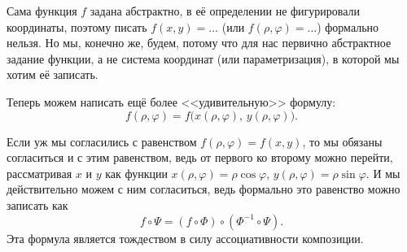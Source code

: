 Сама функция $f$ задана абстрактно, в её определении не фигурировали координаты, поэтому писать $f(x, y) = \ldots$ (или $f(\rho, \varphi) = \ldots$) формально нельзя. Но мы, конечно же, будем, потому что для нас первично абстрактное задание функции, а не система координат (или параметризация), в которой мы хотим её записать.

Теперь можем написать ещё более <<удивительную>> формулу:
\[
	f(\rho, \varphi) = f\big(x(\rho, \varphi),\,y(\rho, \varphi)\big).
\]

Если уж мы согласились с равенством $f(\rho, \varphi) = f(x, y)$, то мы обязаны согласиться и с этим равенством, ведь от первого ко второму можно перейти, рассматривая $x$ и $y$ как функции $x(\rho, \varphi) = \rho\cos\varphi$, $y(\rho, \varphi) = \rho\sin\varphi$. И мы действительно можем с ним согласиться, ведь формально это равенство можно записать как
\[
	f \circ \Psi = (f \circ \Phi) \circ (\Phi^{-1} \circ \Psi).
\]
Эта формула является тождеством в силу ассоциативности композиции.

